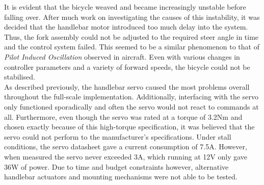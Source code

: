 It is evident that the bicycle weaved and became increasingly unstable before falling over. After much work on investigating the causes of this instability, it was decided that the handlebar motor introduced too much delay into the system. Thus, the fork assembly could not be adjusted to the required steer angle in time and the control system failed. This seemed to be a similar phenomenon to that of \textit{Pilot Induced Oscillation} observed in aircraft. Even with various changes in controller parameters and a variety of forward speeds, the bicycle could not be stabilised. \\

As described previously, the handlebar servo caused the most problems overall throughout the full-scale implementation. Additionally, interfacing with the servo only functioned sporadically and often the servo would not react to commands at all. Furthermore, even though the servo was rated at a torque of 3.2Nm and chosen exactly because of this high-torque specification, it was believed that the servo could not perform to the manufacturer's specifications. Under stall conditions, the servo datasheet gave a current consumption of 7.5A. However, when measured the servo never exceeded 3A, which running at 12V only gave 36W of power. Due to time and budget constraints however, alternative handlebar actuators and mounting mechanisms were not able to be tested. 

\newpage